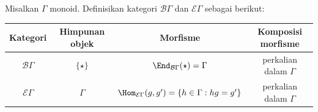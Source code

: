\begin{example}\label{eg:classifying-space}
	Misalkan $\Gamma$ monoid. Definisikan kategori $\mathcal{B}\Gamma$ dan
	$\mathcal{E}\Gamma$ sebagai berikut:
	\begin{center}\begin{tabular}{|c|c|c|c|}\hline
		Kategori & Himpunan objek & Morfisme & Komposisi morfisme \\ \hline
		$\mathcal{B}\Gamma$ & $\{\star\}$ & $\End_{\mathcal{B}\Gamma}(\star)=\Gamma$ & perkalian dalam $\Gamma$ \\ \hline
		$\mathcal{E}\Gamma$ & $\Gamma$ & $\Hom_{\mathcal{E}\Gamma}(g,g')=\{h\in\Gamma:hg=g'\}$ & perkalian dalam $\Gamma$ \\ \hline
	\end{tabular}\end{center}


\end{example}
